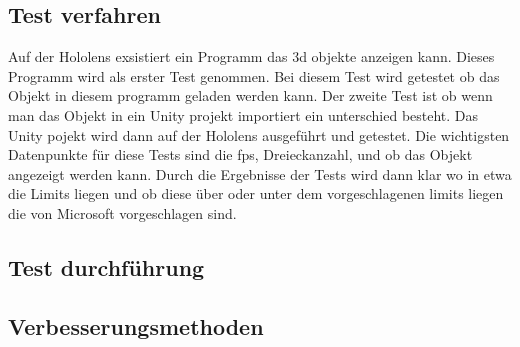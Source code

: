 \newpage
\subsection{Test verfahren}\label{subsec:Test verfahren}

Auf der Hololens exsistiert ein Programm das 3d objekte anzeigen kann.
Dieses Programm wird als erster Test genommen.
Bei diesem Test wird getestet ob das Objekt in diesem programm geladen werden kann.
Der zweite Test ist ob wenn man das Objekt in ein Unity projekt importiert ein unterschied besteht.
Das Unity pojekt wird dann auf der Hololens ausgeführt und getestet.
Die wichtigsten Datenpunkte für diese Tests sind die fps, Dreieckanzahl, und ob das Objekt angezeigt werden kann.
Durch die Ergebnisse der Tests wird dann klar wo in etwa die Limits liegen und ob diese über oder unter dem vorgeschlagenen limits \autocite{optimize_3d} liegen die von Microsoft vorgeschlagen sind.








\subsection{Test durchführung}\label{subsec:Test durchführung}


\subsection{Verbesserungsmethoden}\label{subsec:Verbesserungsmethoden}


